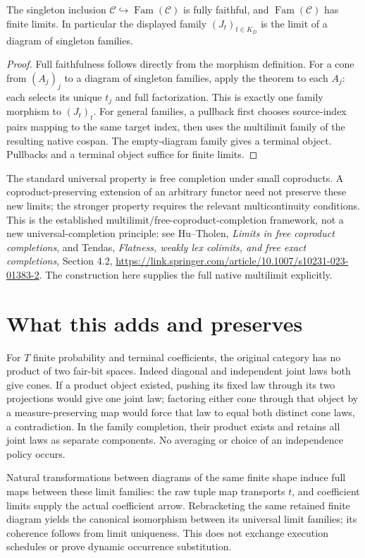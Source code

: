 \documentclass[11pt]{article}
\begin{document}
\begin{proposition}
The singleton inclusion $\mathcal C\hookrightarrow\operatorname{Fam}(\mathcal C)$ is fully faithful, and $\operatorname{Fam}(\mathcal C)$ has finite limits. In particular the displayed family $(J_t)_{t\in K_D}$ is the limit of a diagram of singleton families.
\end{proposition}
\begin{proof}
Full faithfulness follows directly from the morphism definition. For a cone from $(A_j)_j$ to a diagram of singleton families, apply the theorem to each $A_j$: each selects its unique $t_j$ and full factorization. This is exactly one family morphism to $(J_t)_t$. For general families, a pullback first chooses source-index pairs mapping to the same target index, then uses the multilimit family of the resulting native cospan. The empty-diagram family gives a terminal object. Pullbacks and a terminal object suffice for finite limits.
\end{proof}
The standard universal property is free completion under small coproducts. A coproduct-preserving extension of an arbitrary functor need not preserve these new limits; the stronger property requires the relevant multicontinuity conditions. This is the established multilimit/free-coproduct-completion framework, not a new universal-completion principle: see Hu--Tholen, \emph{Limits in free coproduct completions}, and Tendas, \emph{Flatness, weakly lex colimits, and free exact completions}, Section 4.2, \url{https://link.springer.com/article/10.1007/s10231-023-01383-2}. The construction here supplies the full native multilimit explicitly.

\section{What this adds and preserves}
For $T$ finite probability and terminal coefficients, the original category has no product of two fair-bit spaces. Indeed diagonal and independent joint laws both give cones. If a product object existed, pushing its fixed law through its two projections would give one joint law; factoring either cone through that object by a measure-preserving map would force that law to equal both distinct cone laws, a contradiction. In the family completion, their product exists and retains all joint laws as separate components. No averaging or choice of an independence policy occurs.

Natural transformations between diagrams of the same finite shape induce full maps between these limit families: the raw tuple map transports $t$, and coefficient limits supply the actual coefficient arrow. Rebracketing the same retained finite diagram yields the canonical isomorphism between its universal limit families; its coherence follows from limit uniqueness. This does not exchange execution schedules or prove dynamic occurrence substitution.
\end{document}
